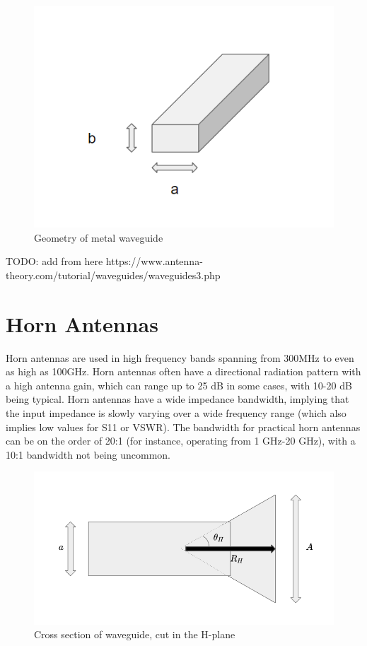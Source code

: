\documentclass[a4paper,12pt]{report}
\begin{document}
\begin{figure}
  \begin{center}
    \includegraphics[clip, keepaspectratio, width=0.5\linewidth]{img/metal_waveguide_with_dims.png}
    \caption{Geometry of metal waveguide}
    \label{fig:metal_waveguide_geometry}
  \end{center}
\end{figure}

TODO: add from here https://www.antenna-theory.com/tutorial/waveguides/waveguides3.php


\section{Horn Antennas}

Horn antennas are used in high frequency bands spanning from 300MHz
to even as high as 100GHz.
Horn antennas often have a directional radiation pattern with a high antenna gain,
which can range up to 25 dB in some cases, with 10-20 dB being typical.
Horn antennas have a wide impedance bandwidth,
implying that the input impedance is slowly varying over a wide frequency range (which also implies low values for S11 or VSWR). The bandwidth for practical horn antennas can be on the order of 20:1 (for instance, operating from 1 GHz-20 GHz),
with a 10:1 bandwidth not being uncommon.

\begin{figure}
  \begin{center}
    \includegraphics[clip, keepaspectratio, width=0.5\linewidth]{img/horn_antenna_h_plane_cross_section.png}
    \caption{Cross section of waveguide, cut in the H-plane}
    \label{fig:horn_antenna_h_plane_cross_section}
  \end{center}
\end{figure}
\end{document}

